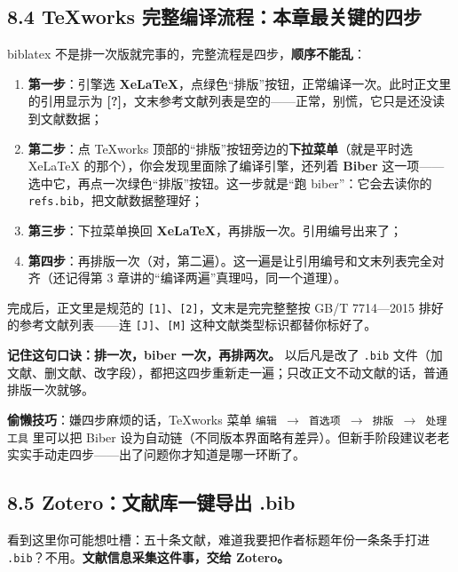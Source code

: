 \subsection*{8.4 TeXworks 完整编译流程：本章最关键的四步}

biblatex 不是排一次版就完事的，完整流程是四步，\textbf{顺序不能乱}：

\begin{enumerate}
\setlength{\itemsep}{2pt}
\item \textbf{第一步}：引擎选 \textbf{XeLaTeX}，点绿色“排版”按钮，正常编译一次。此时正文里的引用显示为 \textbf{[?]}，文末参考文献列表是空的——正常，别慌，它只是还没读到文献数据；
\item \textbf{第二步}：点 TeXworks 顶部的“排版”按钮旁边的\textbf{下拉菜单}（就是平时选 XeLaTeX 的那个），你会发现里面除了编译引擎，还列着 \textbf{Biber} 这一项——选中它，再点一次绿色“排版”按钮。这一步就是“跑 biber”：它会去读你的 \texttt{refs.bib}，把文献数据整理好；
\item \textbf{第三步}：下拉菜单换回 \textbf{XeLaTeX}，再排版一次。引用编号出来了；
\item \textbf{第四步}：再排版一次（对，第二遍）。这一遍是让引用编号和文末列表完全对齐（还记得第 3 章讲的“编译两遍”真理吗，同一个道理）。
\end{enumerate}

完成后，正文里是规范的 \texttt{[1]}、\texttt{[2]}，文末是完完整整按 GB/T 7714—2015 排好的参考文献列表——连 \texttt{[J]}、\texttt{[M]} 这种文献类型标识都替你标好了。

\textbf{记住这句口诀：排一次，biber 一次，再排两次。} 以后凡是改了 \texttt{.bib} 文件（加文献、删文献、改字段），都把这四步重新走一遍；只改正文不动文献的话，普通排版一次就够。

\begin{notebox}
\textbf{偷懒技巧}：嫌四步麻烦的话，TeXworks 菜单 \texttt{编辑 \ensuremath{\rightarrow} 首选项 \ensuremath{\rightarrow} 排版 \ensuremath{\rightarrow} 处理工具} 里可以把 Biber 设为自动链（不同版本界面略有差异）。但新手阶段建议老老实实手动走四步——出了问题你才知道是哪一环断了。
\end{notebox}

\subsection*{8.5 Zotero：文献库一键导出 .bib}

看到这里你可能想吐槽：五十条文献，难道我要把作者标题年份一条条手打进 \texttt{.bib}？不用。\textbf{文献信息采集这件事，交给 Zotero。}

